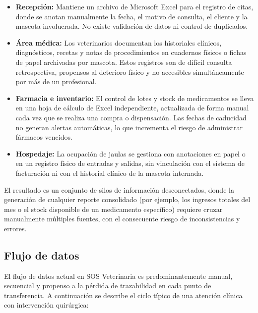 \begin{itemize}
	\item \textbf{Recepción:} Mantiene un archivo de Microsoft Excel para el registro de citas, donde se anotan manualmente la fecha, el motivo de consulta, el cliente y la mascota involucrada. No existe validación de datos ni control de duplicados.
	\item \textbf{Área médica:} Los veterinarios documentan los historiales clínicos, diagnósticos, recetas y notas de procedimientos en cuadernos físicos o fichas de papel archivadas por mascota. Estos registros son de difícil consulta retrospectiva, propensos al deterioro físico y no accesibles simultáneamente por más de un profesional.
	\item \textbf{Farmacia e inventario:} El control de lotes y stock de medicamentos se lleva en una hoja de cálculo de Excel independiente, actualizada de forma manual cada vez que se realiza una compra o dispensación. Las fechas de caducidad no generan alertas automáticas, lo que incrementa el riesgo de administrar fármacos vencidos.
	\item \textbf{Hospedaje:} La ocupación de jaulas se gestiona con anotaciones en papel o en un registro físico de entradas y salidas, sin vinculación con el sistema de facturación ni con el historial clínico de la mascota internada.
\end{itemize}

El resultado es un conjunto de silos de información desconectados, donde la generación de cualquier reporte consolidado (por ejemplo, los ingresos totales del mes o el stock disponible de un medicamento específico) requiere cruzar manualmente múltiples fuentes, con el consecuente riesgo de inconsistencias y errores.

\subsection{Flujo de datos}

El flujo de datos actual en SOS Veterinaria es predominantemente manual, secuencial y propenso a la pérdida de trazabilidad en cada punto de transferencia. A continuación se describe el ciclo típico de una atención clínica con intervención quirúrgica:

